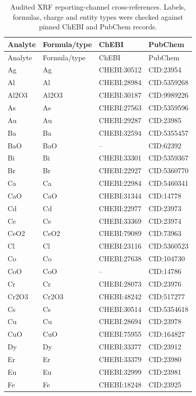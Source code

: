 \setlength{\LTleft}{0pt plus 1fill}
\setlength{\LTright}{0pt plus 1fill}
\begin{longtable}{llll}
\caption{Audited XRF reporting-channel cross-references. Labels, formulas, charge and entity types were checked against pinned ChEBI and PubChem records.} \label{tab:chebi_mapping} \\
\toprule
Analyte & Formula/type & ChEBI & PubChem \\
\midrule
\endfirsthead
\toprule
Analyte & Formula/type & ChEBI & PubChem \\
\midrule
\endhead
\bottomrule
\endfoot
Ag & Ag & CHEBI:30512 & CID:23954 \\
Al & Al & CHEBI:28984 & CID:5359268 \\
Al2O3 & Al2O3 & CHEBI:30187 & CID:9989226 \\
As & As & CHEBI:27563 & CID:5359596 \\
Au & Au & CHEBI:29287 & CID:23985 \\
Ba & Ba & CHEBI:32594 & CID:5355457 \\
BaO & BaO & -- & CID:62392 \\
Bi & Bi & CHEBI:33301 & CID:5359367 \\
Br & Br & CHEBI:22927 & CID:5360770 \\
Ca & Ca & CHEBI:22984 & CID:5460341 \\
CaO & CaO & CHEBI:31344 & CID:14778 \\
Cd & Cd & CHEBI:22977 & CID:23973 \\
Ce & Ce & CHEBI:33369 & CID:23974 \\
CeO2 & CeO2 & CHEBI:79089 & CID:73963 \\
Cl & Cl & CHEBI:23116 & CID:5360523 \\
Co & Co & CHEBI:27638 & CID:104730 \\
CoO & CoO & -- & CID:14786 \\
Cr & Cr & CHEBI:28073 & CID:23976 \\
Cr2O3 & Cr2O3 & CHEBI:48242 & CID:517277 \\
Cs & Cs & CHEBI:30514 & CID:5354618 \\
Cu & Cu & CHEBI:28694 & CID:23978 \\
CuO & CuO & CHEBI:75955 & CID:164827 \\
Dy & Dy & CHEBI:33377 & CID:23912 \\
Er & Er & CHEBI:33379 & CID:23980 \\
Eu & Eu & CHEBI:32999 & CID:23981 \\
Fe & Fe & CHEBI:18248 & CID:23925 \\

\end{longtable}
